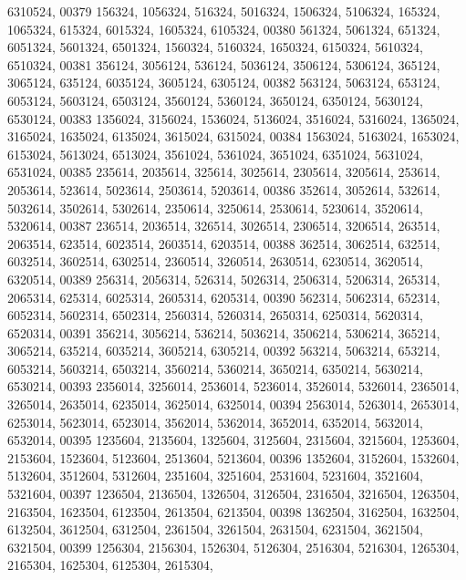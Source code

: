\begin{DoxyCode}
      6310524,
00379        156324, 1056324,  516324, 5016324, 1506324, 5106324,  165324, 1065324,  615324, 6015324, 1605324, 
      6105324,
00380        561324, 5061324,  651324, 6051324, 5601324, 6501324, 1560324, 5160324, 1650324, 6150324, 5610324, 
      6510324,
00381        356124, 3056124,  536124, 5036124, 3506124, 5306124,  365124, 3065124,  635124, 6035124, 3605124, 
      6305124,
00382        563124, 5063124,  653124, 6053124, 5603124, 6503124, 3560124, 5360124, 3650124, 6350124, 5630124, 
      6530124,
00383       1356024, 3156024, 1536024, 5136024, 3516024, 5316024, 1365024, 3165024, 1635024, 6135024, 3615024, 
      6315024,
00384       1563024, 5163024, 1653024, 6153024, 5613024, 6513024, 3561024, 5361024, 3651024, 6351024, 5631024, 
      6531024,
00385        235614, 2035614,  325614, 3025614, 2305614, 3205614,  253614, 2053614,  523614, 5023614, 2503614, 
      5203614,
00386        352614, 3052614,  532614, 5032614, 3502614, 5302614, 2350614, 3250614, 2530614, 5230614, 3520614, 
      5320614,
00387        236514, 2036514,  326514, 3026514, 2306514, 3206514,  263514, 2063514,  623514, 6023514, 2603514, 
      6203514,
00388        362514, 3062514,  632514, 6032514, 3602514, 6302514, 2360514, 3260514, 2630514, 6230514, 3620514, 
      6320514,
00389        256314, 2056314,  526314, 5026314, 2506314, 5206314,  265314, 2065314,  625314, 6025314, 2605314, 
      6205314,
00390        562314, 5062314,  652314, 6052314, 5602314, 6502314, 2560314, 5260314, 2650314, 6250314, 5620314, 
      6520314,
00391        356214, 3056214,  536214, 5036214, 3506214, 5306214,  365214, 3065214,  635214, 6035214, 3605214, 
      6305214,
00392        563214, 5063214,  653214, 6053214, 5603214, 6503214, 3560214, 5360214, 3650214, 6350214, 5630214, 
      6530214,
00393       2356014, 3256014, 2536014, 5236014, 3526014, 5326014, 2365014, 3265014, 2635014, 6235014, 3625014, 
      6325014,
00394       2563014, 5263014, 2653014, 6253014, 5623014, 6523014, 3562014, 5362014, 3652014, 6352014, 5632014, 
      6532014,
00395       1235604, 2135604, 1325604, 3125604, 2315604, 3215604, 1253604, 2153604, 1523604, 5123604, 2513604, 
      5213604,
00396       1352604, 3152604, 1532604, 5132604, 3512604, 5312604, 2351604, 3251604, 2531604, 5231604, 3521604, 
      5321604,
00397       1236504, 2136504, 1326504, 3126504, 2316504, 3216504, 1263504, 2163504, 1623504, 6123504, 2613504, 
      6213504,
00398       1362504, 3162504, 1632504, 6132504, 3612504, 6312504, 2361504, 3261504, 2631504, 6231504, 3621504, 
      6321504,
00399       1256304, 2156304, 1526304, 5126304, 2516304, 5216304, 1265304, 2165304, 1625304, 6125304, 2615304, 

\end{DoxyCode}
